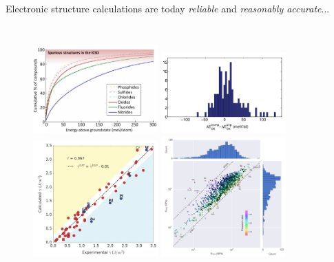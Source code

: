 \documentclass[aspectratio=169]{beamer}
\begin{document}
\begin{frame}{Electronic structure calculations are today \textit{reliable} and \textit{reasonably accurate}...}
\begin{columns}
            \begin{figure}
                \centering
                \includegraphics[width=0.45\textwidth]{figures/icsd_e_hull.png}
                \includegraphics[width=0.45\textwidth]{figures/formation_energies.png}\\
                \includegraphics[width=0.45\textwidth]{figures/surface_energies.png}
                \includegraphics[width=0.45\textwidth]{figures/elastic_constants.png}
            \end{figure}
            \begin{itemize}

\end{itemize}
\end{columns}
\end{frame}
\end{document}
